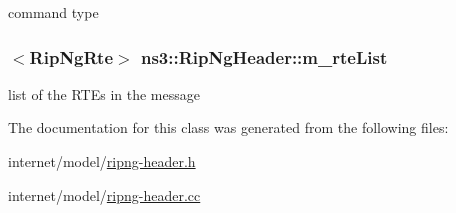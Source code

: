 command type 

\subsubsection[{\texorpdfstring{m\+\_\+rte\+List}{m_rteList}}]{$<${\bf Rip\+Ng\+Rte}$>$ ns3\+::\+Rip\+Ng\+Header\+::m\+\_\+rte\+List\hspace{0.3cm}{\ttfamily [private]}}\hypertarget{classns3_1_1RipNgHeader_a988dbcaa0b4bfbc0e635eb43ada954d5}{}\label{classns3_1_1RipNgHeader_a988dbcaa0b4bfbc0e635eb43ada954d5}


list of the R\+T\+Es in the message 



The documentation for this class was generated from the following files\+:\begin{DoxyCompactItemize}
\item 
internet/model/\hyperlink{ripng-header_8h}{ripng-\/header.\+h}\item 
internet/model/\hyperlink{ripng-header_8cc}{ripng-\/header.\+cc}\end{DoxyCompactItemize}
